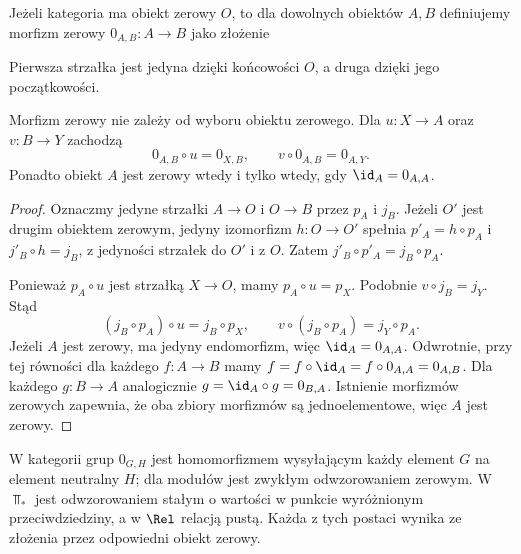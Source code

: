 \begin{definicja}\label{cat:def:zero-morphism}
Jeżeli kategoria ma obiekt zerowy $O$, to dla dowolnych obiektów $A,B$ definiujemy morfizm zerowy $0_{A,B}:A\to B$ jako złożenie
\begin{center}
\end{center}
Pierwsza strzałka jest jedyna dzięki końcowości $O$, a druga dzięki jego początkowości.
\end{definicja}

\begin{stwierdzenie}\label{cat:prop:zero-absorption}
Morfizm zerowy nie zależy od wyboru obiektu zerowego. Dla $u:X\to A$ oraz $v:B\to Y$ zachodzą
\[
0_{A,B}\circ u=0_{X,B},\qquad
v\circ0_{A,B}=0_{A,Y}.
\]
Ponadto obiekt $A$ jest zerowy wtedy i tylko wtedy, gdy $\id_A=0_{A,A}$.
\end{stwierdzenie}
\begin{proof}
Oznaczmy jedyne strzałki $A\to O$ i $O\to B$ przez $p_A$ i $j_B$. Jeżeli $O'$ jest drugim obiektem zerowym, jedyny izomorfizm $h:O\to O'$ spełnia $p'_A=h\circ p_A$ i $j'_B\circ h=j_B$, z jedyności strzałek do $O'$ i z $O$. Zatem $j'_B\circ p'_A=j_B\circ p_A$.

Ponieważ $p_A\circ u$ jest strzałką $X\to O$, mamy $p_A\circ u=p_X$. Podobnie $v\circ j_B=j_Y$. Stąd
\[
(j_B\circ p_A)\circ u=j_B\circ p_X,
\qquad v\circ(j_B\circ p_A)=j_Y\circ p_A.
\]
Jeżeli $A$ jest zerowy, ma jedyny endomorfizm, więc $\id_A=0_{A,A}$. Odwrotnie, przy tej równości dla każdego $f:A\to B$ mamy $f=f\circ\id_A=f\circ0_{A,A}=0_{A,B}$. Dla każdego $g:B\to A$ analogicznie $g=\id_A\circ g=0_{B,A}$. Istnienie morfizmów zerowych zapewnia, że oba zbiory morfizmów są jednoelementowe, więc $A$ jest zerowy.
\end{proof}

\begin{przyklad}
W kategorii grup $0_{G,H}$ jest homomorfizmem wysyłającym każdy element $G$ na element neutralny $H$; dla modułów jest zwykłym odwzorowaniem zerowym. W $\Top_*$ jest odwzorowaniem stałym o wartości w punkcie wyróżnionym przeciwdziedziny, a w $\Rel$ relacją pustą. Każda z tych postaci wynika ze złożenia przez odpowiedni obiekt zerowy.
\end{przyklad}

